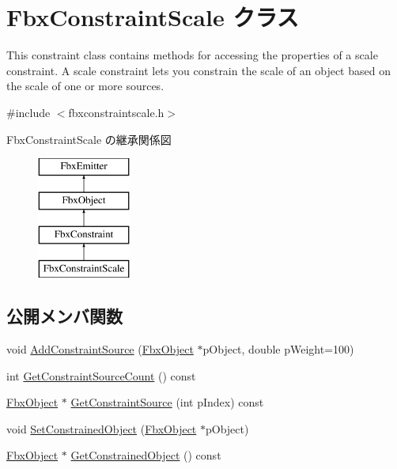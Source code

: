 \hypertarget{class_fbx_constraint_scale}{}\section{Fbx\+Constraint\+Scale クラス}
\label{class_fbx_constraint_scale}


This constraint class contains methods for accessing the properties of a scale constraint. A scale constraint lets you constrain the scale of an object based on the scale of one or more sources.  




{\ttfamily \#include $<$fbxconstraintscale.\+h$>$}

Fbx\+Constraint\+Scale の継承関係図\begin{figure}[H]
\begin{center}
\leavevmode
\includegraphics[height=4.000000cm]{class_fbx_constraint_scale}
\end{center}
\end{figure}
\subsection*{公開メンバ関数}
\begin{DoxyCompactItemize}
\item 
void \hyperlink{class_fbx_constraint_scale_a876e788ab98cf2fe1042ae3c687b3689}{Add\+Constraint\+Source} (\hyperlink{class_fbx_object}{Fbx\+Object} $\ast$p\+Object, double p\+Weight=100)
\item 
int \hyperlink{class_fbx_constraint_scale_a5c4500706618751078dddca3652ce936}{Get\+Constraint\+Source\+Count} () const
\item 
\hyperlink{class_fbx_object}{Fbx\+Object} $\ast$ \hyperlink{class_fbx_constraint_scale_ac957fc33cab352ef355602fb4325c5b7}{Get\+Constraint\+Source} (int p\+Index) const
\item 
void \hyperlink{class_fbx_constraint_scale_adf626a9273449dd4c74cf24f2a7bf5af}{Set\+Constrained\+Object} (\hyperlink{class_fbx_object}{Fbx\+Object} $\ast$p\+Object)
\item 
\hyperlink{class_fbx_object}{Fbx\+Object} $\ast$ \hyperlink{class_fbx_constraint_scale_a1dcbdc6b41d04d6a75ca47f024e05dc9}{Get\+Constrained\+Object} () const
\end{DoxyCompactItemize}

